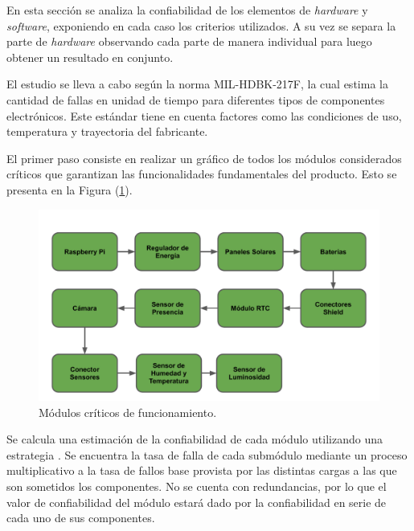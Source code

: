 %

%
En esta sección se analiza la confiabilidad de los elementos de \textit{hardware} y \textit{software}, exponiendo en cada caso los criterios utilizados. A su vez se separa la parte de \textit{hardware} observando cada parte de manera individual para luego obtener un resultado en conjunto.

El estudio se lleva a cabo según la norma MIL-HDBK-217F, la cual estima la cantidad de fallas en unidad de tiempo para diferentes tipos de componentes electrónicos. Este estándar tiene en cuenta factores como las condiciones de uso, temperatura y trayectoria del fabricante.

El primer paso consiste en realizar un gráfico de todos los módulos considerados críticos que garantizan las funcionalidades fundamentales del producto. Esto se presenta en la Figura (\ref{fig:criticos}).
\begin{figure}[H]
	\centering
	\includegraphics[width=0.9\linewidth,page=1]{ImagenesEstudios/ModulosCriticos}		
	\caption{Módulos críticos de funcionamiento.}
	\label{fig:criticos}
\end{figure}
Se calcula una estimación de la confiabilidad de cada módulo utilizando una estrategia . Se encuentra la tasa de falla de cada submódulo mediante un proceso multiplicativo a la tasa de fallos base provista por las distintas cargas a las que son sometidos los componentes.
No se cuenta con redundancias, por lo que el valor de confiabilidad del módulo estará dado por la confiabilidad en serie de cada uno de sus componentes.

